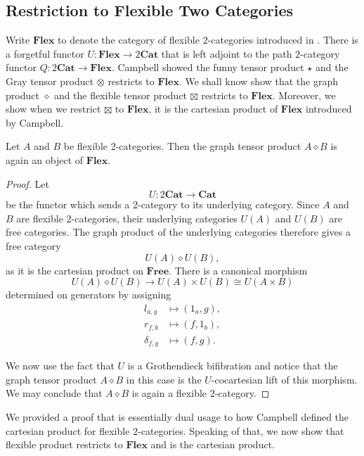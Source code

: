 \documentclass{tac}
\begin{document}
\subsection{Restriction to Flexible Two Categories}
Write $\mathbf{Flex}$ to denote the category of flexible $2$-categories introduced in \cite{Campbell2026}. There is a forgetful functor $U:\mathbf{Flex}\to 2\mathbf{Cat}$ that is left adjoint to the path $2$-category functor $Q:2\mathbf{Cat}\to\mathbf{Flex}$. Campbell showed the funny tensor product $\star$ and the Gray tensor product $\otimes$ restricts to $\mathbf{Flex}$. We shall know show that the graph product $\diamond$ and the flexible tensor product $\boxtimes$ restricts to $\mathbf{Flex}$. Moreover, we show when we restrict $\boxtimes$ to $\mathbf{Flex}$, it is the cartesian product of $\mathbf{Flex}$ introduced by Campbell.

\begin{proposition}
Let $A$ and $B$ be flexible $2$-categories. Then the graph tensor
product $A\diamond B$ is again an object of $\mathbf{Flex}$.
\end{proposition}

\begin{proof}
Let
\[
U:2\mathbf{Cat}\longrightarrow \mathbf{Cat}
\]
be the functor which sends a $2$-category to its underlying
category. Since $A$ and $B$ are flexible $2$-categories, their underlying
categories $U(A)$ and $U(B)$ are free categories. The graph product of the underlying categories therefore gives a free
category
\[
U(A)\diamond U(B),
\]
as it is the cartesian product on $\textbf{Free}$. There is a canonical morphism
\[
U(A)\diamond U(B)\longrightarrow U(A)\times U(B)\cong U(A\times B)
\]
determined on generators by assigning
\begin{align*}
l_{a,g}&\longmapsto (1_a,g),\\
r_{f,b}&\longmapsto (f,1_b),\\
\delta_{f,g}&\longmapsto (f,g).
\end{align*}

We now use the fact that $U$ is a Grothendieck bifibration and notice that the graph tensor product $A\diamond B$ in this case is the
$U$-cocartesian lift of this morphism. We may conclude that $A\diamond B$ is again a flexible
$2$-category.
\end{proof}

We provided a proof that is essentially dual usage to how Campbell defined the cartesian product for flexible $2$-categories. Speaking of that, we now show that flexible product restricts to $\mathbf{Flex}$ and is the cartesian product.
\end{document}
